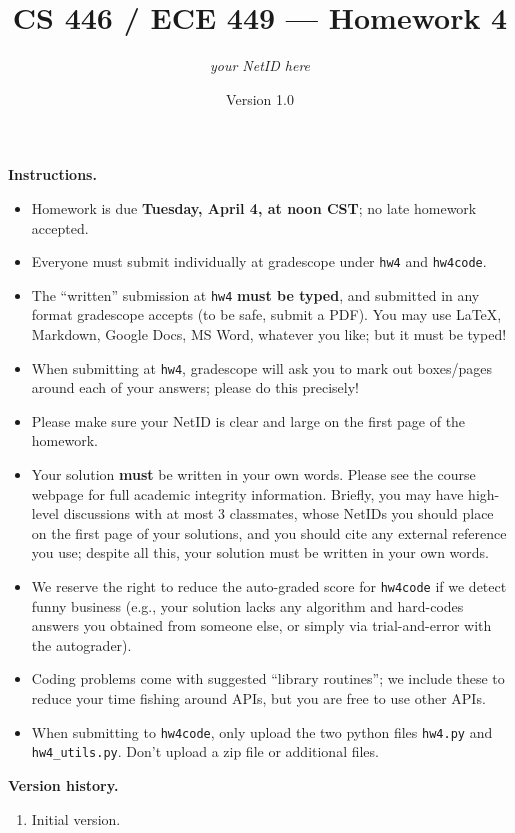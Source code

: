 \documentclass{article}
\title{CS 446 / ECE 449 --- Homework 4}
\author{\emph{your NetID here}}
\date{Version 1.0}
\theoremstyle{definition}
\theoremstyle{remark}
\begin{document}
  \maketitle

  \noindent\textbf{Instructions.}
  \begin{itemize}
    \item
      Homework is due \textbf{Tuesday, April 4, at noon CST}; no late homework accepted.

    \item
      Everyone must submit individually at gradescope under \texttt{hw4} and \texttt{hw4code}.

    \item
      The ``written'' submission at \texttt{hw4} \textbf{must be typed}, and submitted in
      any format gradescope accepts (to be safe, submit a PDF).  You may use \LaTeX, Markdown,
      Google Docs, MS Word, whatever you like; but it must be typed!

    \item
      When submitting at \texttt{hw4}, gradescope will ask you to mark out boxes/pages
      around each of your answers; please do this precisely!

    \item
      Please make sure your NetID is clear and large on the first page of the homework.

    \item
      Your solution \textbf{must} be written in your own words.
      Please see the course webpage for full academic integrity information.
      Briefly, you may have high-level discussions with at most 3 classmates,
      whose NetIDs you should place on the first page of your solutions,
      and you should cite any external reference you use; despite all this,
      your solution must be written in your own words.

    \item
      We reserve the right to reduce the auto-graded score for
      \texttt{hw4code} if we detect funny business (e.g., your solution
      lacks any algorithm and hard-codes answers you obtained from
      someone else, or simply via trial-and-error with the autograder).

    \item
      Coding problems come with suggested ``library routines''; we include these to reduce
      your time fishing around APIs, but you are free to use other APIs.

    \item
      When submitting to \texttt{hw4code}, only upload the two python files \texttt{hw4.py} and \texttt{hw4\_utils.py}. Don't upload a zip file or additional files.

  \end{itemize}
  \noindent\textbf{Version history.}
  \begin{enumerate}
    \item Initial version.
  \end{enumerate}
\end{document}
